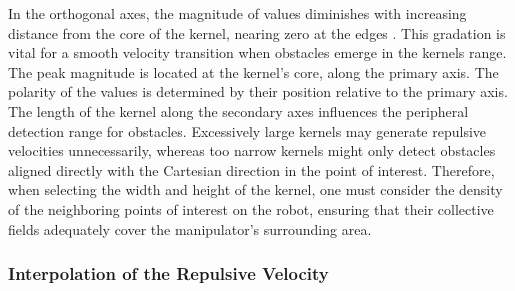 \documentclass[]{article}
\begin{document}
In the orthogonal axes, the magnitude of values diminishes with increasing distance from the core of the kernel, nearing zero at the edges . This gradation is vital for a smooth velocity transition when obstacles emerge in the kernels range. The peak magnitude is located at the kernel's core, along the primary axis. The polarity of the values is determined by their position relative to the primary axis. The length of the kernel along the secondary axes influences the peripheral detection range for obstacles. Excessively large kernels may generate repulsive velocities unnecessarily, whereas too narrow kernels might only detect obstacles aligned directly with the Cartesian direction in the point of interest. Therefore, when selecting the width and height of the kernel, one must consider the density of the neighboring points of interest on the robot, ensuring that their collective fields adequately cover the manipulator's surrounding area.



\subsubsection{Interpolation of the Repulsive Velocity}

%
%
%
%
\end{document}
